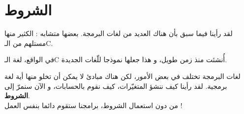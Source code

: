 \chapter{الشروط}

لقد رأينا فيما سبق بأن هناك العديد من لغات البرمجة. بعضها متشابه : الكثير منها مستلهم من الـ\textenglish{C}.

في الواقع، لغة  الـ\textenglish{C}
أُنشئت منذ زمن طويل، و هذا جعلها نموذجا للّغات الجديدة.

لغات البرمجة تختلف في بعض الأمور، لكن هناك مبادئ لا يمكن أن تخلو منها أية لغة برمجية. لقد رأينا كيف ننشؤ المتغيّرات، كيف نقوم بالحسابات، و الآن سنمرّ إلى 
\textbf{الشروط}.\\
من دون استعمال الشروط، برامجنا ستقوم دائما بنفس العمل !
